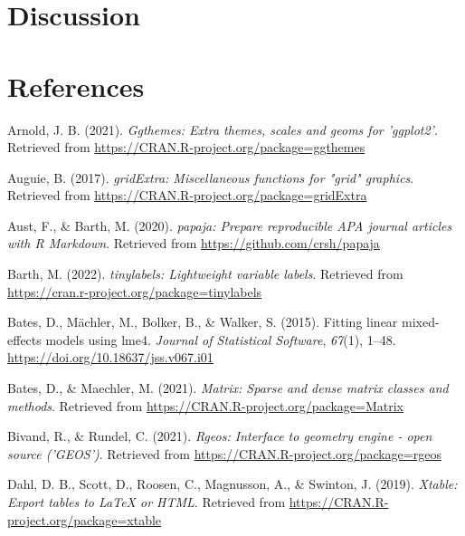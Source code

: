 \documentclass[
  man,floatsintext]{apa6}
\newlength{\cslhangindent}
\newlength{\cslentryspacingunit} %
\newenvironment{CSLReferences}[2] %
 {%
  \setlength{\parindent}{0pt}
  \ifodd #1
  \let\oldpar\par
  \def\par{\hangindent=\cslhangindent\oldpar}
  \fi
  \setlength{\parskip}{#2\cslentryspacingunit}
 }%
 {}
\begin{document}
\hypertarget{discussion}{%
\section{Discussion}\label{discussion}}

\newpage

\hypertarget{references}{%
\section{References}\label{references}}

\begingroup
\setlength{\parindent}{-0.5in}
\setlength{\leftskip}{0.5in}

\hypertarget{refs}{}
\begin{CSLReferences}{1}{0}
\leavevmode{}%
Arnold, J. B. (2021). \emph{Ggthemes: Extra themes, scales and geoms for 'ggplot2'}. Retrieved from \url{https://CRAN.R-project.org/package=ggthemes}

\leavevmode{}%
Auguie, B. (2017). \emph{gridExtra: Miscellaneous functions for "grid" graphics}. Retrieved from \url{https://CRAN.R-project.org/package=gridExtra}

\leavevmode{}%
Aust, F., \& Barth, M. (2020). \emph{{papaja}: {Prepare} reproducible {APA} journal articles with {R Markdown}}. Retrieved from \url{https://github.com/crsh/papaja}

\leavevmode{}%
Barth, M. (2022). \emph{{tinylabels}: Lightweight variable labels}. Retrieved from \url{https://cran.r-project.org/package=tinylabels}

\leavevmode{}%
Bates, D., Mächler, M., Bolker, B., \& Walker, S. (2015). Fitting linear mixed-effects models using {lme4}. \emph{Journal of Statistical Software}, \emph{67}(1), 1--48. \url{https://doi.org/10.18637/jss.v067.i01}

\leavevmode{}%
Bates, D., \& Maechler, M. (2021). \emph{Matrix: Sparse and dense matrix classes and methods}. Retrieved from \url{https://CRAN.R-project.org/package=Matrix}

\leavevmode{}%
Bivand, R., \& Rundel, C. (2021). \emph{Rgeos: Interface to geometry engine - open source ('GEOS')}. Retrieved from \url{https://CRAN.R-project.org/package=rgeos}

\leavevmode{}%
Dahl, D. B., Scott, D., Roosen, C., Magnusson, A., \& Swinton, J. (2019). \emph{Xtable: Export tables to LaTeX or HTML}. Retrieved from \url{https://CRAN.R-project.org/package=xtable}


\end{CSLReferences}
\end{document}

